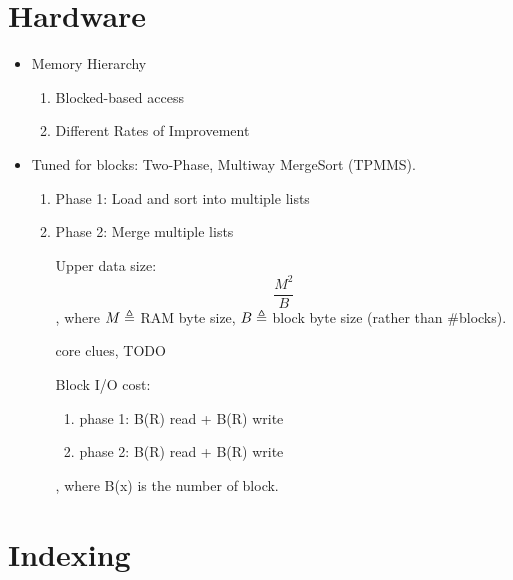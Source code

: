 \documentclass[a4paper]{report}
\begin{document}
\chapter{Hardware}
\begin{itemize}
\item Memory Hierarchy 
\begin{enumerate}
\item Blocked-based access 
\item Different Rates of Improvement 
\end{enumerate}
\item Tuned for blocks: Two-Phase, Multiway MergeSort (TPMMS). 
\begin{enumerate}
\item Phase 1: Load and sort into multiple lists 
\item Phase 2: Merge multiple lists 

Upper data size: 
$$
\frac{M^2}{B}
$$
, where $M\triangleq$ RAM byte size, $B\triangleq$ block byte size (rather than \#blocks).

core clues, TODO

Block I/O cost:
\begin{enumerate}
\item phase 1: B(R) read + B(R) write 
\item phase 2: B(R) read + B(R) write 
\end{enumerate}
, where B(x) is the number of block. 
\end{enumerate}
\end{itemize}


\chapter{Indexing}
\end{document}
